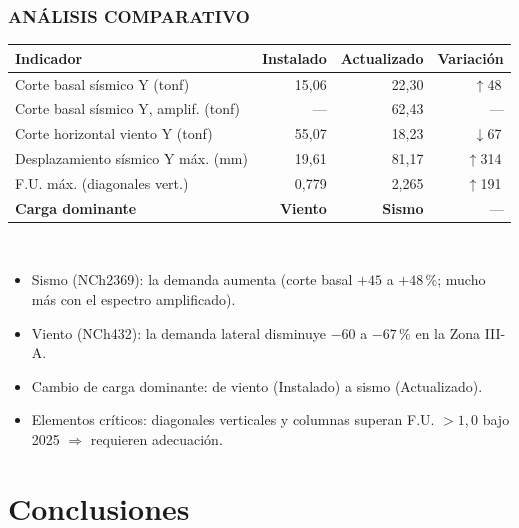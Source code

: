 \documentclass[11.5pt,aspectratio=169,handout]{beamer}
\newcommand{\ctitle}[1]{\frametitle{#1}}
\begin{document}
\begin{frame}
\ctitle{ANÁLISIS COMPARATIVO}
\vspace{1mm}
{\scriptsize
\begin{tabular}{@{}lrrr@{}}
  \toprule
  Indicador & Instalado & Actualizado & Variación \\
  \midrule
  Corte basal sísmico Y (tonf) & 15,06 & 22,30 & {\color{red}$\uparrow$48\,\text{\%}} \\
  Corte basal sísmico Y, amplif. (tonf) & --- & 62,43 & --- \\
  Corte horizontal viento Y (tonf) & 55,07 & 18,23 & {\color{verdeBox}$\downarrow$67\,\text{\%}} \\
  Desplazamiento sísmico Y máx. (mm) & 19,61 & 81,17 & {\color{red}$\uparrow$314\,\text{\%}} \\
  F.U. máx. (diagonales vert.) & 0,779 & 2,265 & {\color{red}$\uparrow$191\,\text{\%}} \\
  \textbf{Carga dominante} & \textbf{Viento} & \textbf{Sismo} & --- \\
  \bottomrule
\end{tabular}}\\[3mm]
\begin{itemize}\footnotesize\setlength{\itemsep}{2mm}
  \item \alert{Sismo (NCh2369)}: la demanda \alert{aumenta} (corte basal $+45$ a $+48\,\text{\%}$; mucho más con el
        espectro amplificado).
  \item \alert{Viento (NCh432)}: la demanda lateral \alert{disminuye} $-60$ a $-67\,\text{\%}$ en la Zona III-A.
  \item \alert{Cambio de carga dominante}: de viento (Instalado) a \alert{sismo} (Actualizado).
  \item \alert{Elementos críticos}: diagonales verticales y columnas superan \alert{F.U. $> 1{,}0$} bajo 2025 $\Rightarrow$ requieren \alert{adecuación}.
\end{itemize}
\end{frame}

\section{Conclusiones}
\end{document}
